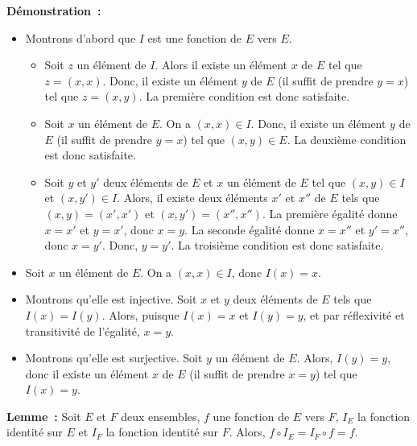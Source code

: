 \medskip 

\noindent\textbf{Démonstration :} 
\begin{itemize}[nosep]
    \item Montrons d'abord que $I$ est une fonction de $E$ vers $E$. 
        \begin{itemize}[nosep]
            \item Soit $z$ un élément de $I$. 
                Alors il existe un élément $x$ de $E$ tel que $z = (x,x)$. 
                Donc, il existe un élément $y$ de $E$ (il suffit de prendre $y=x$) tel que $z = (x,y)$.
                La première condition est donc satisfaite.
            \item Soit $x$ un élément de $E$. 
                On a $(x,x) \in I$. 
                Donc, il existe un élément $y$ de $E$ (il suffit de prendre $y = x$) tel que $(x,y) \in E$.
                La deuxième condition est donc satisfaite.
            \item Soit $y$ et $y'$ deux éléments de $E$ et $x$ un élément de $E$ tel que $(x,y) \in I$ et $(x,y') \in I$.
                Alors, il existe deux éléments $x'$ et $x''$ de $E$ tels que $(x,y) = (x',x')$ et $(x,y') = (x'',x'')$. 
                La première égalité donne $x = x'$ et $y = x'$, donc $x = y$.
                La seconde égalité donne $x = x''$ et $y' = x''$, donc $x = y'$. 
                Donc, $y = y'$.
                La troisième condition est donc satisfaite.
        \end{itemize}
    \item Soit $x$ un élément de $E$.
        On a $(x,x) \in I$, donc $I(x) = x$.
    \item Montrons qu'elle est injective.
        Soit $x$ et $y$ deux éléments de $E$ tels que $I(x) = I(y)$. 
        Alors, puisque $I(x) = x$ et $I(y) = y$, et par réflexivité et transitivité de l'égalité, $x = y$.
    \item Montrons qu'elle est surjective. 
        Soit $y$ un élément de $E$. 
        Alors, $I(y) = y$, donc il existe un élément $x$ de $E$ (il suffit de prendre $x = y$) tel que $I(x) = y$.
\end{itemize}

\done

\medskip

\noindent\textbf{Lemme :} Soit $E$ et $F$ deux ensembles, $f$ une fonction de $E$ vers $F$, $I_E$ la fonction identité sur $E$ et $I_F$ la fonction identité sur $F$. 
    Alors, $f \circ I_E = I_F \circ f = f$.

